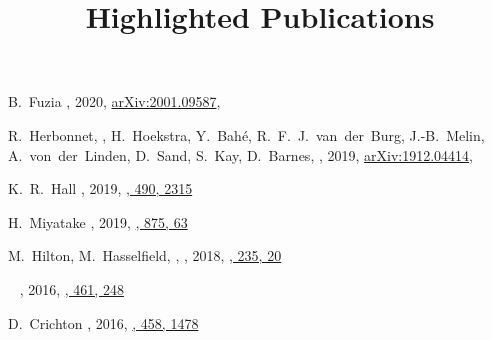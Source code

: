 \title{Highlighted Publications}


\noindent



\begin{etaremune}

\item
B.~Fuzia 
,
2020, \href{https://ui.adsabs.harvard.edu/abs/2020arXiv200109587F/abstract}{arXiv:2001.09587},
\submitted{\mnras}

\item
R.~Herbonnet, \myself, H.~Hoekstra, Y.~Bah\'e, R.~F.~J.~van~der~Burg, J.-B.~Melin, A.~von~der~Linden, D.~Sand, S.~Kay, D.~Barnes,
,
2019, \href{https://ui.adsabs.harvard.edu/abs/2019arXiv191204414H/abstract}{arXiv:1912.04414},
\submitted{\mnras}

\item K.~R.~Hall 
,
2019, \href{https://ui.adsabs.harvard.edu/abs/2019MNRAS.490.2315H/abstract}{\mnras, 490, 2315}

\item
H.~Miyatake 
,
2019, \href{http://adsabs.harvard.edu/abs/2019ApJ...875...63M}{\apj, 875, 63}

\item
M.~Hilton, M.~Hasselfield, \myself, 
,
2018, \href{http://ui.adsabs.harvard.edu/abs/2018ApJS..235...20H}{\apjs, 235, 20}

\item
\myself\ 
,
2016, \href{http://adsabs.harvard.edu/abs/2016MNRAS.461..248S}{\mnras, 461, 248}

\item
D.~Crichton 
,
2016, \href{http://adsabs.harvard.edu/abs/2016MNRAS.458.1478C}{\mnras, 458, 1478}


\end{etaremune}
